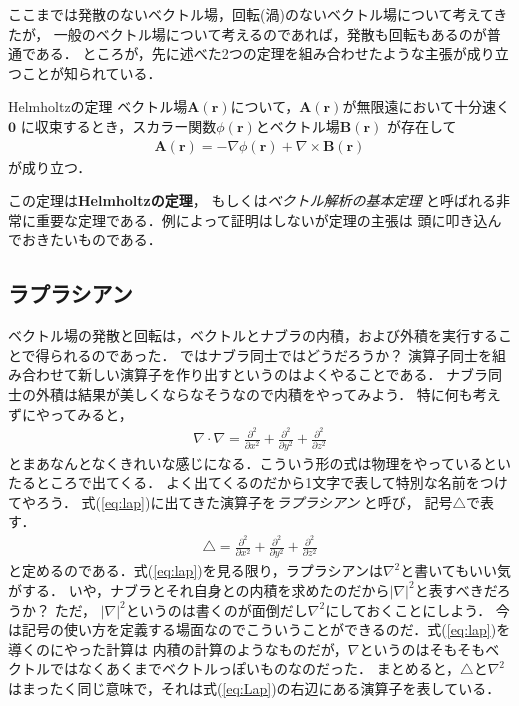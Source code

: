ここまでは発散のないベクトル場，回転(渦)のないベクトル場について考えてきたが，
一般のベクトル場について考えるのであれば，発散も回転もあるのが普通である．
ところが，先に述べた2つの定理を組み合わせたような主張が成り立つことが知られている．
\begin{itembox}[l]{Helmholtzの定理}
ベクトル場$\bm{A}(\bm{r})$について，$\bm{A}(\bm{r})$が無限遠において十分速く$\bm{0}$
に収束するとき，スカラー関数$\phi ( \bm{r})$とベクトル場$\bm{B}(\bm{r})$
が存在して
\begin{align}
\bm{A}(\bm{r}) = - \nabla \phi (\bm{r} ) + \nabla \times \bm{B}(\bm{r})
\label{eq:helmholtz}
\end{align}
が成り立つ．
\end{itembox}
この定理は\textbf{Helmholtzの定理}，
もしくは\emph{ベクトル解析の基本定理}
と呼ばれる非常に重要な定理である．例によって証明はしないが定理の主張は
頭に叩き込んでおきたいものである．

\subsection{ラプラシアン}
ベクトル場の発散と回転は，ベクトルとナブラの内積，および外積を実行することで得られるのであった．
ではナブラ同士ではどうだろうか？ 演算子同士を組み合わせて新しい演算子を作り出すというのはよくやることである．
ナブラ同士の外積は結果が美しくならなそうなので内積をやってみよう．
特に何も考えずにやってみると，
\begin{align}
\nabla \cdot \nabla = \frac{\partial^2}{\partial x^2} + \frac{\partial^2}{\partial y^2} + \frac{\partial^2}{\partial z^2}
\label{eq:lap}
\end{align}
とまあなんとなくきれいな感じになる．こういう形の式は物理をやっているといたるところで出てくる．
よく出てくるのだから1文字で表して特別な名前をつけてやろう．
式(\ref{eq:lap})に出てきた演算子を\emph{ラプラシアン}
と呼び，
記号$\bigtriangleup$で表す．
\begin{align}
\bigtriangleup = \frac{\partial^2}{\partial x^2} + \frac{\partial^2}{\partial y^2} + \frac{\partial^2}{\partial z^2}
\label{eq:Lap}
\end{align}
と定めるのである．式(\ref{eq:lap})を見る限り，ラプラシアンは$\nabla^2$と書いてもいい気がする．
いや，ナブラとそれ自身との内積を求めたのだから$| \nabla |^2$と表すべきだろうか？ ただ，
$| \nabla |^2$というのは書くのが面倒だし$\nabla^2$にしておくことにしよう．
今は記号の使い方を定義する場面なのでこういうことができるのだ．式(\ref{eq:lap})を導くのにやった計算は
内積の計算のようなものだが，$\nabla$というのはそもそもベクトルではなくあくまでベクトルっぽいものなのだった．
まとめると，$\bigtriangleup$と$\nabla^2$はまったく同じ意味で，それは式(\ref{eq:Lap})の右辺にある演算子を表している．

